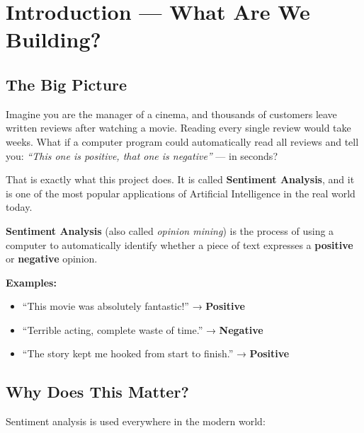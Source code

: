 \documentclass[12pt, a4paper]{article}
\begin{document}
\tableofcontents
\newpage

\section{Introduction — What Are We Building?}

\subsection{The Big Picture}

Imagine you are the manager of a cinema, and thousands of customers leave written reviews after watching a movie. Reading every single review would take weeks. What if a computer program could automatically read all reviews and tell you: \emph{``This one is positive, that one is negative''} — in seconds?

That is exactly what this project does. It is called \textbf{Sentiment Analysis}, and it is one of the most popular applications of Artificial Intelligence in the real world today.

\begin{conceptbox}
\textbf{Sentiment Analysis} (also called \emph{opinion mining}) is the process of using a computer to automatically identify whether a piece of text expresses a \textcolor{positive}{\textbf{positive}} or \textcolor{negative}{\textbf{negative}} opinion.

\medskip
\textbf{Examples:}
\begin{itemize}[leftmargin=1.5em]
  \item \textcolor{positive}{``This movie was absolutely fantastic!''} → \textbf{Positive}
  \item \textcolor{negative}{``Terrible acting, complete waste of time.''} → \textbf{Negative}
  \item \textcolor{positive}{``The story kept me hooked from start to finish.''} → \textbf{Positive}
\end{itemize}
\end{conceptbox}

\subsection{Why Does This Matter?}

Sentiment analysis is used everywhere in the modern world:
\end{document}
